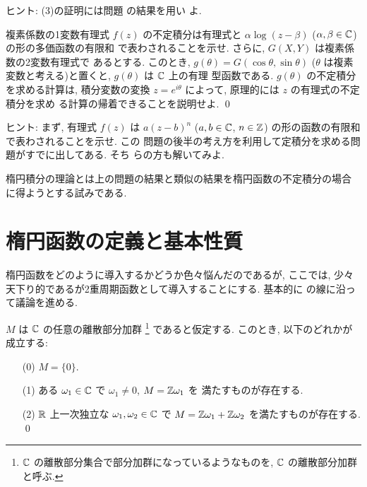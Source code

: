 \documentclass[12pt,twoside]{jarticle}
\def\Z{{\Bbb Z}} %
\def\R{{\Bbb R}} %
\def\C{{\Bbb C}} %
\begin{document}
\noindent ヒント: (3)の証明には問題  の結果を用い
よ.

\begin{question}[有理式と三角函数の有理式の不定積分]
  複素係数の1変数有理式 $f(z)$ の不定積分は有理式と %
  $\alpha \log(z-\beta)$ ($\alpha,\beta\in\C$) の形の多価函数の有限和
  で表わされることを示せ.  さらに, $G(X,Y)$ は複素係数の2変数有理式で
  あるとする. このとき, $g(\theta) = G(\cos \theta, \sin \theta)$
  ($\theta$ は複素変数と考える)と置くと, $g(\theta)$ は $\C$ 上の有理
  型函数である. $g(\theta)$ の不定積分を求める計算は, 積分変数の変換 %
  $z = e^{i\theta}$ によって, 原理的には $z$ の有理式の不定積分を求め
  る計算の帰着できることを説明せよ. \qed
\end{question}

\noindent ヒント: まず, 有理式 $f(z)$ は $a(z-b)^n$ %
($a,b\in\C$, $n\in\Z$) の形の函数の有限和で表わされることを示せ.  この
問題の後半の考え方を利用して定積分を求める問題がすでに出してある. そち
らの方も解いてみよ.

\medskip

楕円積分の理論とは上の問題の結果と類似の結果を楕円函数の不定積分の場合
に得ようとする試みである.


\section{楕円函数の定義と基本性質}

楕円函数をどのように導入するかどうか色々悩んだのであるが, ここでは, 少々
天下り的であるが2重周期函数として導入することにする. 
基本的に \cite{HC} の線に沿って議論を進める.

\begin{question}\label{q:per1}
  $M$ は $\C$ の任意の離散部分加群%
  \footnote{$\C$ の離散部分集合で部分加群になっているようなものを,
    $\C$ の離散部分加群と呼ぶ.}%
  であると仮定する. このとき, 以下のどれかが成立する:
  \begin{enumerate}
  \item[(0)] $M = \{0\}$.
  \item[(1)] ある $\omega_1\in\C$ で $\omega_1\ne0$, $M=\Z\omega_1$ を
    満たすものが存在する.
  \item[(2)] $\R$ 上一次独立な $\omega_1,\omega_2\in\C$ で %
    $M=\Z\omega_1+\Z\omega_2$ を満たすものが存在する. 
    \qed
  \end{enumerate}
\end{question}
\end{document}
